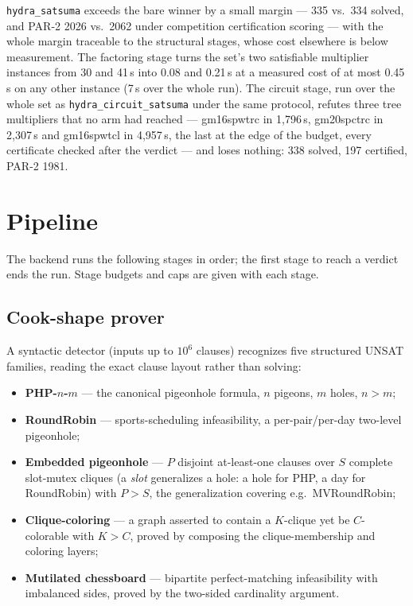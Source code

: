 \documentclass[10pt]{article}
\begin{document}
\texttt{hydra\_satsuma} exceeds the bare winner by a small margin ---
335 vs.\ 334 solved, and PAR-2 2026 vs.\ 2062 under competition
certification scoring --- with the whole margin traceable to the
structural stages, whose cost elsewhere is below measurement. The
factoring stage turns the set's two satisfiable multiplier instances
from 30 and 41\,s into 0.08 and 0.21\,s at a measured cost of at most
0.45\,s on any other instance (7\,s over the whole run). The circuit stage, run over the whole set
as \texttt{hydra\_circuit\_satsuma} under the same protocol, refutes
three tree multipliers that no arm had reached --- gm16spwtrc in
1{,}796\,s, gm20spctrc in 2{,}307\,s and gm16spwtcl in 4{,}957\,s, the
last at the edge of the budget, every certificate checked after the
verdict --- and loses nothing: 338 solved, 197 certified, PAR-2 1981.

\section{Pipeline}
\label{sec:pipeline}

The backend runs the following stages in order; the first stage to
reach a verdict ends the run. Stage budgets and caps are given with
each stage.

\subsection{Cook-shape prover}
\label{sec:cook}

A syntactic detector (inputs up to $10^6$ clauses) recognizes five
structured UNSAT families, reading the exact clause layout rather than
solving:

\begin{itemize}
\item \textbf{PHP-$n$-$m$} --- the canonical pigeonhole formula,
  $n$ pigeons, $m$ holes, $n > m$;
\item \textbf{RoundRobin} --- sports-scheduling infeasibility,
  a per-pair/per-day two-level pigeonhole;
\item \textbf{Embedded pigeonhole} --- $P$ disjoint at-least-one
  clauses over $S$ complete slot-mutex cliques (a \emph{slot}
  generalizes a hole: a hole for PHP, a day for RoundRobin) with
  $P > S$, the generalization covering e.g.\ MVRoundRobin;
\item \textbf{Clique-coloring} --- a graph asserted to contain a
  $K$-clique yet be $C$-colorable with $K > C$, proved by composing
  the clique-membership and coloring layers;
\item \textbf{Mutilated chessboard} --- bipartite perfect-matching
  infeasibility with imbalanced sides, proved by the two-sided
  cardinality argument.
\end{itemize}
\end{document}
